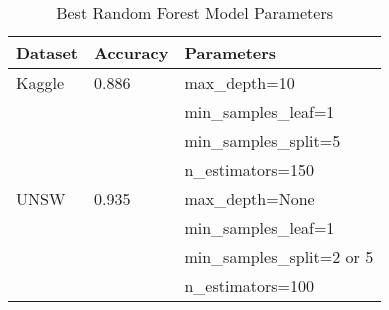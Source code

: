 \documentclass[sigconf,screen,final,nonacm]{acmart}
\begin{document}

\begin{table}[h]
\centering
\caption{Best Random Forest Model Parameters}
\label{tab:best_params}
\begin{tabular}{lll}
\hline
Dataset & Accuracy & Parameters \\
\hline
Kaggle & 0.886 & max\_depth=10 \\
       &       & min\_samples\_leaf=1 \\
       &       & min\_samples\_split=5 \\
       &       & n\_estimators=150 \\
\hline
UNSW   & 0.935 & max\_depth=None \\
       &       & min\_samples\_leaf=1 \\
       &       & min\_samples\_split=2 or 5 \\
       &       & n\_estimators=100 \\
\hline
\end{tabular}
\end{table}
\end{document}
